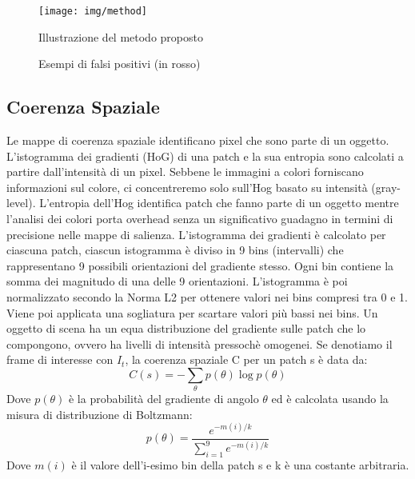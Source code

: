 \documentclass[12pt,oneside]{IEEEtran}
\begin{document}
		\begin{figure}[h]
		\caption{Illustrazione del metodo proposto}
		\begin{center}
		\texttt{[image: img/method]}
		\end{center}
		\end{figure}
		\begin{figure}[h]
		\caption{Esempi di falsi positivi (in rosso)}
		\begin{center}
		\hspace*{.2cm}
		\hspace*{.2cm}
		\end{center}
		\end{figure}
		
		\subsection{Coerenza Spaziale}
			Le mappe di coerenza spaziale identificano pixel che sono parte di un oggetto. L'istogramma dei gradienti (HoG) di una patch e la sua entropia sono calcolati a partire dall'intensità di un pixel. Sebbene le immagini a colori forniscano informazioni sul colore, ci concentreremo solo sull'Hog basato su intensità (gray-level). L'entropia dell'Hog identifica patch che fanno parte di un oggetto mentre l'analisi dei colori porta overhead senza un significativo guadagno in termini di precisione nelle mappe di salienza.\newline
			L'istogramma dei gradienti è calcolato per ciascuna patch, ciascun istogramma è diviso in 9 bins (intervalli) che rappresentano 9 possibili orientazioni del gradiente stesso. Ogni bin contiene la somma dei magnitudo di una delle 9 orientazioni. L'istogramma è poi normalizzato secondo la Norma L2 per ottenere valori nei bins compresi tra 0 e 1.
			Viene poi applicata una sogliatura per scartare valori più bassi nei bins.\newline
			Un oggetto di scena ha un equa distribuzione del gradiente sulle patch che lo compongono, ovvero ha livelli di intensità pressochè omogenei.	Se denotiamo il frame di interesse con $I_{t}$, la coerenza spaziale C per un patch s è data da:\newline
			\begin{equation}
			C(s) = -\sum_{\theta}p(\theta)\log p(\theta)
			\end{equation}
			Dove $p(\theta)$ è la probabilità del gradiente di angolo $\theta$ ed è calcolata usando la misura di distribuzione di Boltzmann:
			\begin{equation}
			p(\theta)= \frac{e^{-m(i)/k}}{\sum_{i=1}^{9}e^{-m(i)/k}}
			\end{equation}
			Dove $m(i)$ è il valore dell'i-esimo bin della patch s e k è una costante arbitraria.
\end{document}

